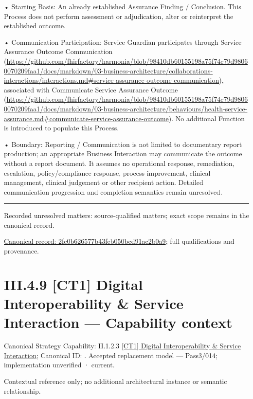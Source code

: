 •
Starting Basis: An already established Assurance Finding / Conclusion. This Process does not perform assessment or adjudication, alter or reinterpret the established outcome.



•
Communication Participation: Service Guardian participates through Service Assurance Outcome Communication (\url{https://github.com/fhirfactory/harmonia/blob/98410db60155198a75f74c79d98060070209faa1/docs/markdown/03-business-architecture/collaborations-interactions/interactions.md#service-assurance-outcome-communication}), associated with Communicate Service Assurance Outcome (\url{https://github.com/fhirfactory/harmonia/blob/98410db60155198a75f74c79d98060070209faa1/docs/markdown/03-business-architecture/behaviours/health-service-assurance.md#communicate-service-assurance-outcome}). No additional Function is introduced to populate this Process.



•
Boundary: Reporting / Communication is not limited to documentary report production; an appropriate Business Interaction may communicate the outcome without a report document. It assumes no operational response, remediation, escalation, policy/compliance response, process improvement, clinical management, clinical judgement or other recipient action. Detailed communication progression and completion semantics remain unresolved.



\medskip\hrule\medskip

{\small Recorded unresolved matters: source-qualified matters; exact scope remains in the canonical record.}\par
{\footnotesize \href{../../../../../../../../continuum/business/business-process/2fc0b626577b43feb050bcd91ac2b0a9.md}{Canonical record: 2fc0b626577b43feb050bcd91ac2b0a9}; full qualifications and provenance.}\par
\section*{III.4.9 [CT1] Digital Interoperability \& Service Interaction — Capability context}
\label{navigation:III.4.9}

{\small Canonical Strategy Capability: II.1.2.3 \hyperref[element:2d94913dccc24c19804b426921f49a6b]{[CT1] Digital Interoperability \& Service Interaction}; Canonical ID: \texttt{}. Accepted replacement model — Pass3/014; implementation unverified · current.}\par
Contextual reference only; no additional architectural instance or semantic relationship.\par

